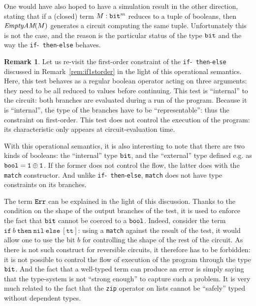 \documentclass{article}
\theoremstyle{plain}
\theoremstyle{definition}
\newtheorem{remark}[theorem]{Remark}
\newcommand{\bit}{{\tt bit}}
\newcommand{\bool}{{\tt bool}}
\newcommand{\unittype}{{\tt 1}}
\newcommand{\tunit}{\unittype}
\newcommand{\ttrue}{\mathtt{t\!t}}
\newcommand{\iftermx}[3]{{{\mathtt{if}}~{#1}~\mathtt{then}~{#2}~\mathtt{else}~{#3}}}
\newcommand{\errorlist}{{\tt Err}}
\newcommand{\nil}{{\mathtt{nil}}}
\newcommand{\emptyam}{\textrm{{\it EmptyAM}}}
\begin{document}
One would have also hoped to have a simulation result in the other
direction, stating that if a (closed) term $M:\bit^m$ reduces to a
tuple of booleans, then $\emptyam(M)$ generates a circuit computing
the same tuple. Unfortunately this is not the case, and the reason is
the particular status of the type $\bit$ and the way the {\tt if}-{\tt
  then}-{\tt else} behaves.


\begin{remark}\label{rem:if1storderbis}
  Let us re-visit the first-order constraint of the {\tt if}-{\tt
    then}-{\tt else} discussed in Remark~\ref{rem:if1storder} in the
  light of this operational semantics. Here, this test behaves as a
  regular boolean operator acting on three arguments: they need to be
  all reduced to values before continuing. This test is ``internal''
  to the circuit: both branches are evaluated during a run of the
  program.  Because it is ``internal'', the type of the branches have
  to be ``representable'': thus the constraint on first-order. This
  test does not control the execution of the program: its
  characteristic only appears at circuit-evaluation time.
  
  With this operational semantics, it is also interesting
  to note that there are two kinds of booleans: the ``internal'' type
  $\bit$, and the ``external'' type defined e.g. as $\bool =
  \tunit\oplus\tunit$. If the former does not control the flow, the
  latter does with the {\tt match} constructor. And unlike {\tt if}-{\tt
    then}-{\tt else}, {\tt match} does not have type
  constraints on its branches.
  
  The term $\errorlist$ can be explained in the light of this
  discussion. Thanks to the condition on the shape of the output
  branches of the test, it is used to enforce the fact that $\bit$
  cannot be coerced to a $\bool$. Indeed, consider the term
  $\iftermx{b}{\nil}{[\ttrue]}$: using a {\tt match} against the
  result of the test, it would allow one to use the bit $b$ for
  controlling the shape of the rest of the circuit. 
As there is not such construct for reversible circuits, it therefore
  has to be forbidden: it is not possible to control the flow of
  execution of the program through the type $\bit$. And the fact that
  a well-typed term can produce an error is simply saying that the
  type-system is not ``strong enough'' to capture such a problem. It
  is very much related to the fact that the {\tt zip} operator on
  lists cannot be ``safely'' typed without dependent types.
\end{remark}
\end{document}
